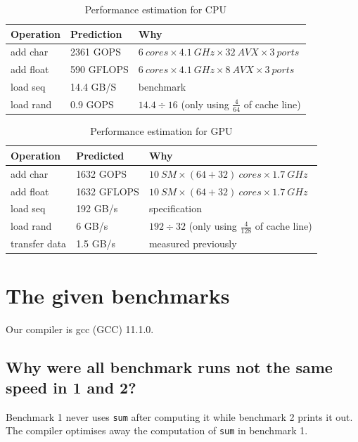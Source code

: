 \documentclass{article}
\begin{document}
\begin{table}[h!]
  \centering
  \begin{tabular}{lll}
    \toprule
    Operation & Prediction & Why \\
    \midrule
    add char & 2361 GOPS & \(6~\mathit{cores} \times 4.1~\mathit{GHz} \times
                           32~\mathit{AVX} \times 3~\mathit{ports}\) \\
    add float & 590 GFLOPS & \(6~\mathit{cores} \times 4.1~\mathit{GHz} \times
                             8~\mathit{AVX} \times 3~\mathit{ports}\) \\
    load seq & 14.4 GB/S & benchmark \\
    load rand & 0.9 GOPS & \(14.4 \div 16\) (only using
                           \(\frac{4}{64}\) of cache line)\\
    \bottomrule
  \end{tabular}
  \caption{Performance estimation for CPU}
  \label{tab:estcpu}
\end{table}
  \begin{table}[h!]
    \centering
    \begin{tabular}{lll}
      \toprule
      Operation & Predicted & Why \\
      \midrule
      add char & 1632 GOPS & \(10~\mathit{SM} \times (64+32)~\mathit{cores}
                             \times 1.7~\mathit{GHz}\) \\
      add float & 1632 GFLOPS & \(10~\mathit{SM} \times
                                (64+32)~\mathit{cores} \times
                                1.7~\mathit{GHz}\) \\
      load seq & 192 GB/s & specification \\
      load rand & 6 GB/s & \(192 \div 32\) (only using
                           \(\frac{4}{128}\) of cache line) \\
      transfer data & 1.5 GB/s & measured previously \\
      \bottomrule
    \end{tabular}
    \caption{Performance estimation for GPU}
    \label{tab:estgpu}
  \end{table}

\section{The given benchmarks}
Our compiler is gcc (GCC) 11.1.0.

\subsection{Why were all benchmark runs not the same speed in 1 and
  2?}
Benchmark 1 never uses \verb|sum| after computing it while benchmark 2
prints it out. The compiler optimises away the computation of \verb|sum|
in benchmark 1.
\end{document}
